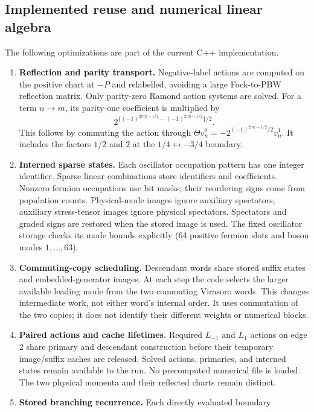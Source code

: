 \documentclass[11pt]{article}
\numberwithin{equation}{section}
\begin{document}
\subsection{Implemented reuse and numerical linear algebra}
\label{sec:branch-optimizations}
The following optimizations are part of the current C++ implementation.
\begin{enumerate}
\item \textbf{Reflection and parity transport.} Negative-label actions are
computed on the positive chart at $-P$ and relabelled, avoiding a large
Fock-to-PBW reflection matrix. Only parity-zero Ramond action systems are solved.
For a term $n\to m$, its parity-one coefficient is multiplied by
\begin{equation}
 2^{\{(-1)^{2|m|-1/2}-(-1)^{2|n|-1/2}\}/2}.
\end{equation}
This follows by commuting the action through
$\Theta v_n^0=-2^{(-1)^{2|n|-1/2}/2}v_n^1$.
It includes the factors $1/2$ and $2$ at the $1/4\leftrightarrow-3/4$ boundary.
\item \textbf{Interned sparse states.} Each oscillator occupation pattern has
one integer identifier. Sparse linear combinations store identifiers and
coefficients. Nonzero fermion occupations use bit masks; their reordering signs
come from population counts. Physical-mode images ignore auxiliary spectators;
auxiliary stress-tensor images ignore physical spectators. Spectators and graded
signs are restored when the stored image is used.
The fixed oscillator storage checks its mode bounds explicitly
(64 positive fermion slots and boson modes $1,\ldots,63$).
\item \textbf{Commuting-copy scheduling.} Descendant words share stored suffix
states and embedded-generator images. At each step the code selects the larger
available leading mode from the two commuting Virasoro words. This changes
intermediate work, not either word's internal order. It uses commutation of the
two copies; it does not identify their different weights or numerical blocks.
\item \textbf{Paired actions and cache lifetimes.} Required $L_{-1}$ and $L_1$
actions on edge 2 share primary and descendant construction before their
temporary image/suffix caches are released. Solved actions, primaries, and
interned states remain available to the run. No precomputed numerical file is
loaded. The two physical momenta and their reflected charts remain distinct.
\item \textbf{Stored branching recurrence.} Each directly evaluated boundary

\end{enumerate}
\end{document}
